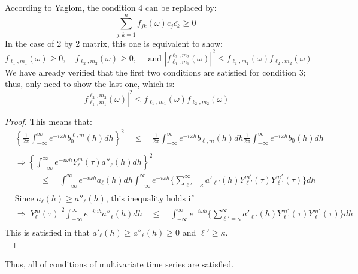\documentclass[11pt]{article}
\begin{document}
\begin{itemize}
\begin{enumerate}
According to Yaglom, the condition 4 can be replaced by:\\
$$\sum_{j,k=1}^n f_{jk}(\omega) c_j \overline{c_k} \ge 0$$
In the case of 2 by 2 matrix, this one is equivalent to show:\\
$$f_{\ell_1,m_1}(\omega) \ge 0, \quad f_{\ell_2,m_2}(\omega) \ge 0, \quad \text{ and } |f_{\ell_1,m_1}^{\ell_2, m_2}(\omega)|^2 \le f_{\ell_1,m_1}(\omega) f_{\ell_2,m_2}(\omega)$$
We have already verified that the first two conditions are satisfied for condition 3; thus, only need to show the last one, which is:\\
$$|f_{\ell_1,m_1}^{\ell_2, m_2}(\omega)|^2 \le f_{\ell_1,m_1}(\omega) f_{\ell_2,m_2}(\omega)$$

\begin{proof}
This means that:
\begin{align*}
&\left\{ \frac{1}{2\pi} \int_{-\infty}^\infty e^{-i\omega h} b_{0}^{\ell,m}(h) dh \right\}^2 \quad \le \quad \frac{1}{2\pi} \int_{-\infty}^\infty e^{-i\omega h} b_{\ell,m}(h) dh \frac{1}{2\pi} \int_{-\infty}^\infty e^{-i\omega h} b_{0}(h) dh \\
\\
&\Rightarrow \left\{ \int_{-\infty}^\infty e^{-i\omega h} Y_{\ell}^{m}(\tau) a''_{\ell}(h) dh \right\}^2\\ 
&\quad \quad \quad \le \quad \int_{-\infty}^\infty e^{-i\omega h} a_{\ell}(h) dh \int_{-\infty}^\infty e^{-i\omega h} \biggl\{ \sum_{{\ell}'=\kappa}^{\infty} a'_{{\ell}'}(h) Y_{{\ell}'}^{{m}'}(\tau) Y_{{\ell}'}^{{m}'}(\tau) \biggl\} dh\\
\\
&\text{Since $a_\ell(h) \ge a''_\ell(h)$, this inequality holds if }\\
&\Rightarrow |Y_{\ell}^{m}(\tau)|^2 \int_{-\infty}^\infty e^{-i\omega h} a''_{\ell}(h) dh \quad \le \quad \int_{-\infty}^\infty e^{-i\omega h} \biggl\{ \sum_{{\ell}'=\kappa}^{\infty} a'_{{\ell}'}(h) Y_{{\ell}'}^{{m}'}(\tau) Y_{{\ell}'}^{{m}'}(\tau) \biggl\} dh\\
\end{align*}
This is satisfied in that $a'_{\ell}(h) \ge a''_\ell(h) \ge 0$ and $\ell' \ge \kappa$.\\
\end{proof}

\end{enumerate}

Thus, all of conditions of multivariate time series are satisfied.\\


\end{itemize}
\end{document}
